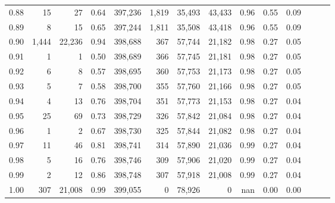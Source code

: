 \begin{tabular}{rrrrrrrrrrrrrr}
0.88 &      15 &      27 &  0.64 &  397,236 &    1,819 &  35,493 &  43,433 &  0.96 &  0.55 &      0.09 \\
0.89 &       8 &      15 &  0.65 &  397,244 &    1,811 &  35,508 &  43,418 &  0.96 &  0.55 &      0.09 \\
0.90 &   1,444 &  22,236 &  0.94 &  398,688 &      367 &  57,744 &  21,182 &  0.98 &  0.27 &      0.05 \\
0.91 &       1 &       1 &  0.50 &  398,689 &      366 &  57,745 &  21,181 &  0.98 &  0.27 &      0.05 \\
0.92 &       6 &       8 &  0.57 &  398,695 &      360 &  57,753 &  21,173 &  0.98 &  0.27 &      0.05 \\
0.93 &       5 &       7 &  0.58 &  398,700 &      355 &  57,760 &  21,166 &  0.98 &  0.27 &      0.05 \\
0.94 &       4 &      13 &  0.76 &  398,704 &      351 &  57,773 &  21,153 &  0.98 &  0.27 &      0.04 \\
0.95 &      25 &      69 &  0.73 &  398,729 &      326 &  57,842 &  21,084 &  0.98 &  0.27 &      0.04 \\
0.96 &       1 &       2 &  0.67 &  398,730 &      325 &  57,844 &  21,082 &  0.98 &  0.27 &      0.04 \\
0.97 &      11 &      46 &  0.81 &  398,741 &      314 &  57,890 &  21,036 &  0.99 &  0.27 &      0.04 \\
0.98 &       5 &      16 &  0.76 &  398,746 &      309 &  57,906 &  21,020 &  0.99 &  0.27 &      0.04 \\
0.99 &       2 &      12 &  0.86 &  398,748 &      307 &  57,918 &  21,008 &  0.99 &  0.27 &      0.04 \\
1.00 &     307 &  21,008 &  0.99 &  399,055 &        0 &  78,926 &       0 &   nan &  0.00 &      0.00 \\
\bottomrule
\end{tabular}
